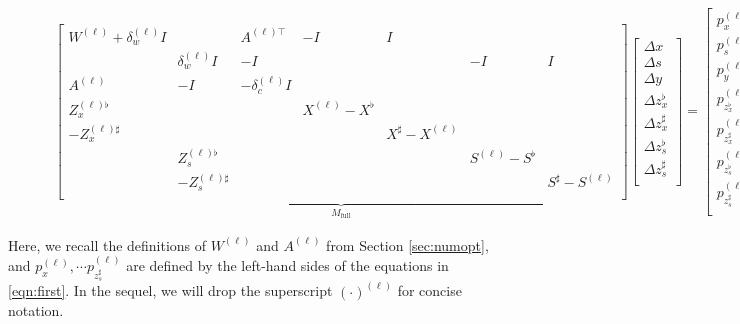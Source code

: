 \documentclass{IEEEtran4PSCC} %
\begin{document}
\begin{figure}[t]
  \vspace{-.2in}
  \begin{align}
    \underbrace{
    \begin{bmatrix}
      W^{(\ell)}  + \delta^{(\ell)}_w I & & A^{(\ell)\top}& -I & I &  \\
      & \delta^{(\ell)}_w I & -I&&&-I & I\\
      A^{(\ell)}& -I & -\delta^{(\ell)}_c I\\
      Z_x^{(\ell)\flat}&&&X^{(\ell)}-X^\flat\\
      -Z_x^{(\ell)\sharp}&&&&X^\sharp-X^{(\ell)}\\
      &Z_s^{(\ell)\flat}&&&&S^{(\ell)}-S^\flat\\
      &-Z_s^{(\ell)\sharp}&&&&&S^\sharp-S^{(\ell)}\\
    \end{bmatrix}
    }_{M_\text{full}}
    \begin{bmatrix}
      \Delta x \\
      \Delta s \\
      \Delta y \\
      \Delta z_x^\flat \\
      \Delta z_x^\sharp \\
      \Delta z_s^\flat \\
      \Delta z_s^\sharp \\
    \end{bmatrix} =
    \begin{bmatrix}
      p^{(\ell)}_{x }\\
      p^{(\ell)}_{s }\\
      p^{(\ell)}_{y }\\
      p^{(\ell)}_{z_x^\flat }\\
      p^{(\ell)}_{z_x^\sharp }\\
      p^{(\ell)}_{z_s^\flat }\\
      p^{(\ell)}_{z_s^\sharp }\\
    \end{bmatrix}
    \label{fig:very-long-eqn} 
  \end{align}
  \vspace{-.3in}
\end{figure}
Here, we recall the definitions of $W^{(\ell)}$ and $A^{(\ell)}$ from Section \ref{sec:numopt}, and
$p^{(\ell)}_x,\cdots p^{(\ell)}_{z_s^\sharp}$ are defined by the left-hand sides of the equations in
\eqref{eqn:first}. In the sequel, we will drop the superscript
$(\cdot)^{(\ell)}$ for concise notation.
\end{document}
